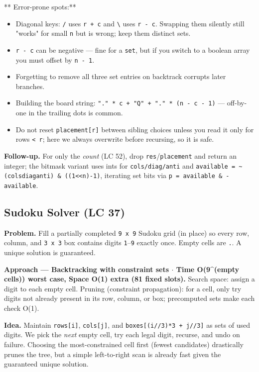 \documentclass[11pt]{article}
\providecommand{\tightlist}{\setlength{\itemsep}{1pt}\setlength{\parskip}{0pt}}
\begin{document}
** Error-prone spots:**

\begin{itemize}
\tightlist
\item
  Diagonal keys: \texttt{/} uses \texttt{r\ +\ c} and \texttt{\textbackslash{}} uses \texttt{r\ -\ c}. Swapping them silently still "works" for small \texttt{n} but is wrong; keep them distinct sets.
\item
  \texttt{r\ -\ c} can be negative --- fine for a \texttt{set}, but if you switch to a boolean array you must offset by \texttt{n\ -\ 1}.
\item
  Forgetting to remove all three set entries on backtrack corrupts later branches.
\item
  Building the board string: \texttt{"."\ *\ c\ +\ "Q"\ +\ "."\ *\ (n\ -\ c\ -\ 1)} --- off-by-one in the trailing dots is common.
\item
  Do not reset \texttt{placement{[}r{]}} between sibling choices unless you read it only for rows \texttt{\textless{}\ r}; here we always overwrite before recursing, so it is safe.
\end{itemize}

\textbf{Follow-up.} For only the \emph{count} (LC 52), drop \texttt{res}/\texttt{placement} and return an integer; the bitmask variant uses ints for \texttt{cols/diag/anti} and \texttt{available\ =\ \textasciitilde{}(cols\textbar{}diag\textbar{}anti)\ \&\ ((1\textless{}\textless{}n)-1)}, iterating set bits via \texttt{p\ =\ available\ \&\ -available}.

\subsection{Sudoku Solver (LC 37)}\label{sudoku-solver-lc-37}

\textbf{Problem.} Fill a partially completed \texttt{9\ x\ 9} Sudoku grid (in place) so every row, column, and \texttt{3\ x\ 3} box contains digits \texttt{1}--\texttt{9} exactly once. Empty cells are \texttt{\textquotesingle{}.\textquotesingle{}}. A unique solution is guaranteed.

\textbf{Approach --- Backtracking with constraint sets \(\cdot\) Time O(9\^{}(empty cells)) worst case, Space O(1) extra (81 fixed slots).} Search space: assign a digit to each empty cell. Pruning (constraint propagation): for a cell, only try digits not already present in its row, column, or box; precomputed sets make each check O(1).

\textbf{Idea.} Maintain \texttt{rows{[}i{]}}, \texttt{cols{[}j{]}}, and \texttt{boxes{[}(i//3)*3\ +\ j//3{]}} as sets of used digits. We pick the \emph{next} empty cell, try each legal digit, recurse, and undo on failure. Choosing the most-constrained cell first (fewest candidates) drastically prunes the tree, but a simple left-to-right scan is already fast given the guaranteed unique solution.
\end{document}
